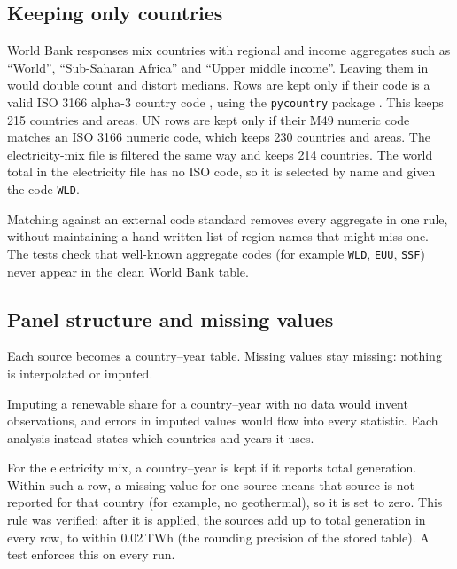 \documentclass[11pt,a4paper]{article}
\newcommand{\code}[1]{\texttt{\small #1}}
\begin{document}
\subsection{Keeping only countries}
World Bank responses mix countries with regional and income aggregates such as ``World'', ``Sub-Saharan Africa'' and ``Upper middle income''. Leaving them in would double count and distort medians. Rows are kept only if their code is a valid ISO 3166 alpha-3 country code \citep{iso3166}, using the \code{pycountry} package \citep{pycountry}. This keeps 215 countries and areas. UN rows are kept only if their M49 numeric code matches an ISO 3166 numeric code, which keeps 230 countries and areas. The electricity-mix file is filtered the same way and keeps 214 countries. The world total in the electricity file has no ISO code, so it is selected by name and given the code \code{WLD}.

\begin{why}
Matching against an external code standard removes every aggregate in one rule, without maintaining a hand-written list of region names that might miss one. The tests check that well-known aggregate codes (for example \code{WLD}, \code{EUU}, \code{SSF}) never appear in the clean World Bank table.
\end{why}

\subsection{Panel structure and missing values}
Each source becomes a country--year table. Missing values stay missing: nothing is interpolated or imputed.

\begin{why}
Imputing a renewable share for a country--year with no data would invent observations, and errors in imputed values would flow into every statistic. Each analysis instead states which countries and years it uses.
\end{why}

For the electricity mix, a country--year is kept if it reports total generation. Within such a row, a missing value for one source means that source is not reported for that country (for example, no geothermal), so it is set to zero. This rule was verified: after it is applied, the sources add up to total generation in every row, to within 0.02\,TWh (the rounding precision of the stored table). A test enforces this on every run.

\end{document}
